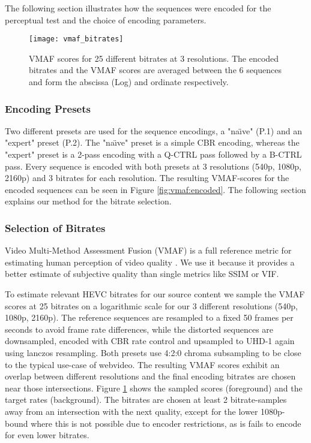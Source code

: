 The following section illustrates how the sequences were encoded for the perceptual test and the choice of encoding parameters.

\begin{figure}[bht!]
	\centering
	\texttt{[image: vmaf\_bitrates]}
	\caption{VMAF scores for 25 different bitrates at 3 resolutions. The encoded bitrates and the VMAF scores are averaged between the 6 sequences and form the abscissa (Log) and ordinate respectively.}
	\label{fig:vmaf:bitrates}
\end{figure}

\subsubsection{Encoding Presets}
Two different presets are used for the sequence encodings, a "na\"{\i}ve" (P.1) and an "expert" preset (P.2). The "na\"{\i}ve" preset is a simple CBR encoding, whereas the "expert" preset is a 2-pass encoding with a Q-CTRL pass followed by a B-CTRL pass.  Every sequence is encoded with both presets at 3 resolutions (540p, 1080p, 2160p) and 3 bitrates for each resolution. The resulting VMAF-scores for the encoded sequences can be seen in Figure \ref{fig:vmaf:encoded}. The following section explains our method for the bitrate selection.

\subsubsection{Selection of Bitrates}
Video Multi-Method Assessment Fusion (VMAF) is a full reference metric for estimating human perception of video quality \cite{lin2013:mmf}. We use it because it provides a better estimate of subjective quality than single metrics like SSIM or VIF.

To estimate relevant HEVC bitrates for our source content we sample the VMAF scores at 25 bitrates on a logarithmic scale for our 3 different resolutions (540p, 1080p, 2160p). The reference sequences are resampled to a fixed 50 frames per seconds to avoid frame rate differences, while the distorted sequences are downsampled, encoded with CBR rate control and upsampled to UHD-1 again using lanczos resampling. Both presets use 4:2:0 chroma subsampling to be close to the typical use-case of webvideo. The resulting VMAF scores exhibit an overlap between different resolutions and the final encoding bitrates are chosen near those intersections. Figure \ref{fig:vmaf:bitrates} shows the sampled scores (foreground) and the target rates (background). The bitrates are chosen at least 2 bitrate-samples away from an intersection with the next quality, except for the lower 1080p-bound where this is not possible due to encoder restrictions, as is fails to encode for even lower bitrates.

